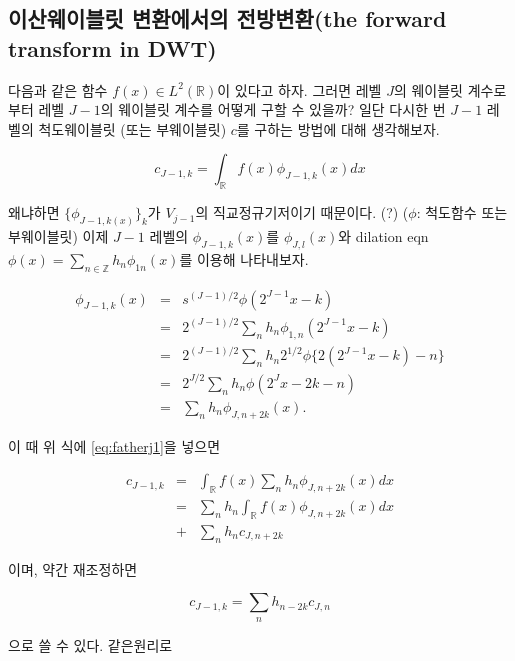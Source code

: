 \documentclass[b5paper,]{scrbook}
\theoremstyle{plain}
\theoremstyle{definition}
\numberwithin{equation}{section}
\begin{document}
\hypertarget{--the-forward-transform-in-dwt}{%
\subsection{이산웨이블릿 변환에서의 전방변환(the forward transform in DWT)}\label{--the-forward-transform-in-dwt}}

다음과 같은 함수 \(f(x)\in L^{2}(\mathbb{R})\)이 있다고 하자. 그러면 레벨 \(J\)의 웨이블릿 계수로부터 레벨 \(J-1\)의 웨이블릿 계수를 어떻게 구할 수 있을까? 일단 다시한 번 \(J-1\) 레벨의 척도웨이블릿 (또는 부웨이블릿) \(c\)를 구하는 방법에 대해 생각해보자.

\begin{equation}
c_{J-1,k}=\int_{\mathbb{R}}f(x)\phi_{J-1,k}(x)dx
\label{eq:fatherj1}
\end{equation}

왜냐하면 \(\{ \phi_{J-1,k(x)}\}_{k}\)가 \(V_{j-1}\)의 직교정규기저이기 때문이다. (?) (\(\phi\): 척도함수 또는 부웨이블릿) 이제 \(J-1\) 레벨의 \(\phi_{J-1,k}(x)\)를 \(\phi_{J,l}(x)\)와 dilation eqn \(\phi(x)=\sum_{n\in\mathbb{Z}}h_{n}\phi_{1n}(x)\)를 이용해 나타내보자.

\begin{eqnarray}
\phi_{J-1,k}(x)&=&s^{(J-1)/2}\phi(2^{J-1}x-k)\nonumber\\
&=&2^{(J-1)/2}\sum_{n}h_{n}\phi_{1,n}(2^{J-1}x-k)\nonumber\\
&=&2^{(J-1)/2}\sum_{n}h_{n}2^{1/2}\phi\{2(2^{J-1}x-k)-n\}\nonumber\\
&=&2^{J/2}\sum_{n}h_{n}\phi(2^{J}x-2k-n)\nonumber\\ 
&=&\sum_{n}h_{n}\phi_{J,n+2k}(x).
\label{eq:fatherj2}
\end{eqnarray}

이 때 위 식에 \eqref{eq:fatherj1}을 넣으면

\begin{eqnarray}
c_{J-1,k}&=&\int_{\mathbb{R}}f(x)\sum_{n}h_{n}\phi_{J,n+2k}(x)dx\nonumber\\
&=&\sum_{n}h_{n}\int_{\mathbb{R}}f(x)\phi_{J,n+2k}(x)dx\nonumber\\
&+&\sum_{n}h_{n}c_{J,n+2k}
\label{eq:fatherj3}
\end{eqnarray}

이며, 약간 재조정하면

\begin{equation}
c_{J-1,k}=\sum_{n}h_{n-2k}c_{J,n}
\label{eq:fatherj4}
\end{equation}

으로 쓸 수 있다. 같은원리로
\end{document}
